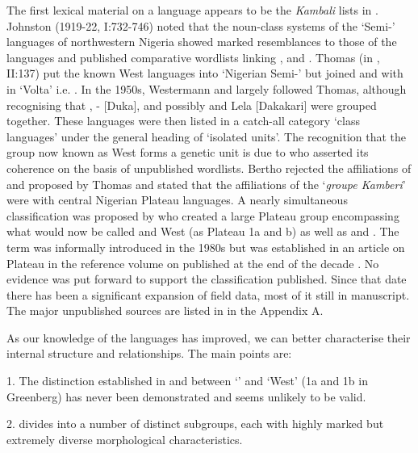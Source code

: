 \documentclass[output=paper]{langsci/langscibook}
\begin{document}
The first lexical material on a  language appears to be the \textit{Kambali} lists in \citet{Koelle1854}. Johnston (1919-22, I:732-746) noted that the noun-class systems of the ‘Semi-’ languages of northwestern Nigeria showed marked resemblances to those of the  languages and published comparative wordlists linking ,  and . Thomas (in \citealt{Meek1925}, II:137) put the known West  languages into ‘Nigerian Semi-’ but joined  and  with  in ‘Volta’ i.e. . In the 1950s, Westermann and \citet[70]{Bryan1952} largely followed Thomas, although recognising that , - [Duka], and possibly  and Lela [Dakakari] were grouped together. These languages were then listed in a catch-all category ‘class languages’ under the general heading of ‘isolated units’. The recognition that the group now known as West  forms a genetic unit is due to \citet[264-6]{Bertho1952} who asserted its coherence on the basis of unpublished wordlists. Bertho rejected the  affiliations of  and  proposed by Thomas and stated that the affiliations of the ‘\textit{groupe Kamberi}’ were with central Nigerian Plateau languages. A nearly simultaneous classification was proposed by \citet{Greenberg1955} who created a large Plateau group encompassing what would now be called  and West  (as Plateau 1a and b) as well as  and . The term  was informally introduced in the 1980s but was established in an article on Plateau in the reference volume on  published at the end of the decade \citep{Gerhardt1989}. No evidence was put forward to support the classification published. Since that date there has been a significant expansion of field data, most of it still in manuscript. The major unpublished sources are listed in  in the Appendix A.

As our knowledge of the  languages has improved, we can better characterise their internal structure and relationships. The main points are:

1. The distinction established in \citet{Rowlands1962} and \citet{Greenberg1963} between ‘’ and ‘West’  (1a and 1b in Greenberg) has never been demonstrated and seems unlikely to be valid.

2.  divides into a number of distinct subgroups, each with highly marked but extremely diverse morphological characteristics.
\end{document}
